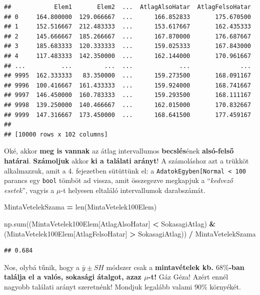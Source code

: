 \documentclass[
]{book}
\newenvironment{Shaded}{\begin{snugshade}}{\end{snugshade}}
\newcommand{\BuiltInTok}[1]{#1}
\newcommand{\NormalTok}[1]{#1}
\newcommand{\OperatorTok}[1]{\textcolor[rgb]{0.81,0.36,0.00}{\textbf{#1}}}
\newcommand{\StringTok}[1]{\textcolor[rgb]{0.31,0.60,0.02}{#1}}
\begin{document}
\begin{verbatim}
##            Elem1       Elem2  ...  AtlagAlsoHatar  AtlagFelsoHatar
## 0     164.800000  129.066667  ...      166.852833       175.670500
## 1     152.516667  212.483333  ...      153.617667       162.435333
## 2     145.666667  185.266667  ...      167.870000       176.687667
## 3     185.683333  120.333333  ...      159.025333       167.843000
## 4     117.483333  142.350000  ...      162.144000       170.961667
## ...          ...         ...  ...             ...              ...
## 9995  162.333333   83.350000  ...      159.273500       168.091167
## 9996  100.416667  161.433333  ...      159.924000       168.741667
## 9997  146.450000  160.783333  ...      159.293500       168.111167
## 9998  139.250000  140.466667  ...      162.015000       170.832667
## 9999  147.316667  173.450000  ...      168.641500       177.459167
## 
## [10000 rows x 102 columns]
\end{verbatim}

Oké, akkor \textbf{meg is vannak} az átlag intervallumos \textbf{becslés}ének \textbf{alsó-felső határai}. \textbf{Számoljuk} akkor \textbf{ki a találati arányt}!
A számoláshoz azt a trükköt alkalmazzuk, amit a 4. fejezetben sütüttünk el: a \texttt{AdatokEgyben{[}\textquotesingle{}Normal\textquotesingle{}{]}\ \textless{}\ 100} parancs egy \texttt{bool} tömböt ad vissza, amit összegezve megkapjuk a ``\emph{kedvező esetek}'', vagyis a \(\mu\)-t helyesen eltaláló intervallumok darabszámát.

\begin{Shaded}
\begin{Highlighting}[]
\NormalTok{MintaVetelekSzama }\OperatorTok{=} \BuiltInTok{len}\NormalTok{(MintaVetelek100Elem)}

\NormalTok{np.}\BuiltInTok{sum}\NormalTok{((MintaVetelek100Elem[}\StringTok{\textquotesingle{}AtlagAlsoHatar\textquotesingle{}}\NormalTok{] }\OperatorTok{\textless{}}\NormalTok{ SokasagiAtlag) }\OperatorTok{\&}\NormalTok{ (MintaVetelek100Elem[}\StringTok{\textquotesingle{}AtlagFelsoHatar\textquotesingle{}}\NormalTok{] }\OperatorTok{\textgreater{}}\NormalTok{ SokasagiAtlag)) }\OperatorTok{/}\NormalTok{ MintaVetelekSzama}
\end{Highlighting}
\end{Shaded}

\begin{verbatim}
## 0.684
\end{verbatim}

Nos, olybá tűnik, hogy a \(\bar{y} \pm SH\) módszer csak a \textbf{mintavételek kb. \(68\%\)-ban találja el a valós, sokasági átalgot, azaz \(\mu\)-t!} Gáz Géza! Azért ennél nagyobb találati arányt szeretnénk! Mondjuk legalább valami \(90\%\) környékét.
\end{document}

